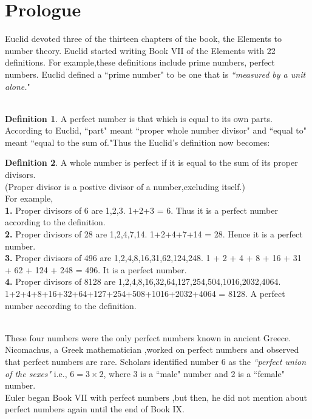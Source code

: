 \documentclass[a4paper,reqno,11pt]{book}
\theoremstyle{plain}%
\theoremstyle{definition}
\newtheorem{defn}{Definition}[chapter]
\begin{document}
\section{Prologue}
Euclid devoted three of the thirteen chapters of the book, the Elements to number 
theory. Euclid started writing Book VII of the Elements with 22 definitions. For example,these definitions include prime numbers, perfect numbers. Euclid defined 
a ``prime number" to be one that is \textit{``measured by a unit alone.}" \\
\\
\begin{defn}\label{defn:Type 1}A perfect number is that which is equal to its own parts.\\ 
According to Euclid, ``part" meant ``proper 
whole number divisor" and  ``equal to" meant ``equal to the sum of."Thus the Euclid's definition now becomes:\\
\end{defn}
\begin{defn}\label{defn:Type 1}
 A whole number is perfect if it is equal to the sum of its proper 
divisors. \\
(Proper divisor is a postive divisor of a number,excluding itself.)\\
For example, \\
\textbf{1.} Proper divisors of 6 are 1,2,3.
1+2+3 = 6. Thus it is a perfect number according to the definition.\\
\textbf{2.} Proper divisors of 28 are 1,2,4,7,14.
1+2+4+7+14 = 28. Hence it is a perfect number.\\
\textbf{3.} Proper divisors of 496 are 1,2,4,8,16,31,62,124,248.
1 + 2 + 4 + 8 + 16 + 31 + 62 + 124 + 248 = 496. It is a perfect number.\\
\noindent \textbf{4.} Proper divisors of 8128 are 1,2,4,8,16,32,64,127,254,504,1016,2032,4064. \\1+2+4+8+16+32+64+127+254+508+1016+2032+4064 = 8128. A perfect number according to the definition.\\
\\
\end{defn}
These four numbers were the only perfect numbers known in ancient Greece. Nicomachus, a Greek mathematician ,worked on perfect numbers and observed that perfect numbers are rare. Scholars identified number 6 as the \textit{``perfect union of the sexes"} i.e., $ 6=3\times2$, where 3 is a ``male" number and 2 is a ``female" number.\\
Euler began Book VII with perfect numbers ,but then, he did not mention about perfect numbers again until the end of Book IX.\\
\end{document}
